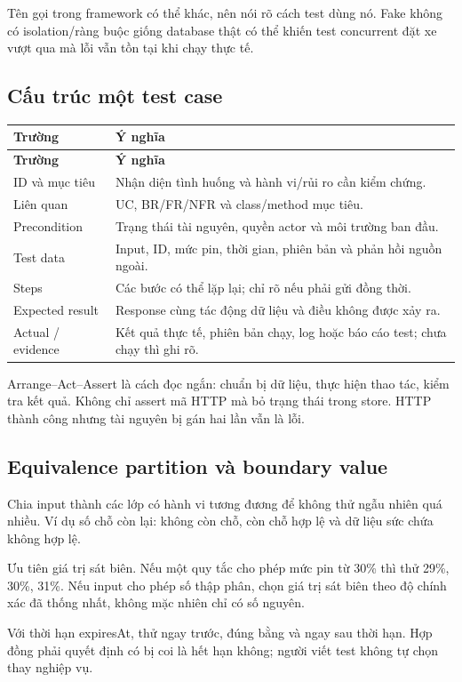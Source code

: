 Tên gọi trong framework có thể khác, nên nói rõ cách test dùng nó. Fake không có isolation/ràng buộc giống database thật có thể khiến test concurrent đặt xe vượt qua mà lỗi vẫn tồn tại khi chạy thực tế.

\subsection{Cấu trúc một test case}
\begin{longtable}{|L{31mm}|L{111mm}|}\hline
\textbf{Trường} & \textbf{Ý nghĩa}\\\hline
\endfirsthead
\hline
\textbf{Trường} & \textbf{Ý nghĩa}\\\hline
\endhead
ID và mục tiêu & Nhận diện tình huống và hành vi/rủi ro cần kiểm chứng.\\\hline
Liên quan & UC, BR/FR/NFR và class/method mục tiêu.\\\hline
Precondition & Trạng thái tài nguyên, quyền actor và môi trường ban đầu.\\\hline
Test data & Input, ID, mức pin, thời gian, phiên bản và phản hồi nguồn ngoài.\\\hline
Steps & Các bước có thể lặp lại; chỉ rõ nếu phải gửi đồng thời.\\\hline
Expected result & Response cùng tác động dữ liệu và điều không được xảy ra.\\\hline
Actual / evidence & Kết quả thực tế, phiên bản chạy, log hoặc báo cáo test; chưa chạy thì ghi rõ.\\\hline
\end{longtable}

Arrange--Act--Assert là cách đọc ngắn: chuẩn bị dữ liệu, thực hiện thao tác, kiểm tra kết quả. Không chỉ assert mã HTTP mà bỏ trạng thái trong store. HTTP thành công nhưng tài nguyên bị gán hai lần vẫn là lỗi.

\subsection{Equivalence partition và boundary value}
Chia input thành các lớp có hành vi tương đương để không thử ngẫu nhiên quá nhiều. Ví dụ số chỗ còn lại: không còn chỗ, còn chỗ hợp lệ và dữ liệu sức chứa không hợp lệ.

Ưu tiên giá trị sát biên. Nếu một quy tắc cho phép mức pin từ 30\% thì thử 29\%, 30\%, 31\%. Nếu input cho phép số thập phân, chọn giá trị sát biên theo độ chính xác đã thống nhất, không mặc nhiên chỉ có số nguyên.

Với thời hạn expiresAt, thử ngay trước, đúng bằng và ngay sau thời hạn. Hợp đồng phải quyết định  có bị coi là hết hạn không; người viết test không tự chọn thay nghiệp vụ.

